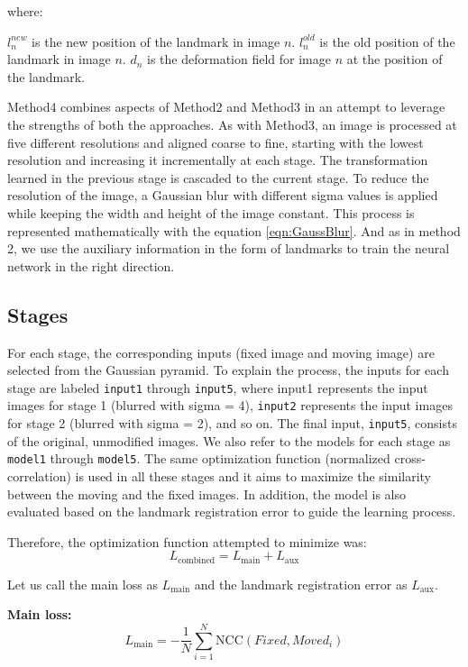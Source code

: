 \documentclass{report}
\begin{document}
	where:
	
	$l_n^{new}$ is the new position of the landmark in image $n$. $l_n^{old}$ is the old position of the landmark in image $n$. $d_n$ is the deformation field for image $n$ at the position of the landmark.
	
	Method4 combines aspects of Method2 and Method3 in an attempt to leverage the strengths of both the approaches. As with Method3, an image is processed at five different resolutions and aligned coarse to fine, starting with the lowest resolution and increasing it incrementally at each stage. The transformation learned in the previous stage is cascaded to the current stage. To reduce the resolution of the image, a Gaussian blur with different sigma values is applied while keeping the width and height of the image constant. This process is represented mathematically with the equation \ref{eqn:GaussBlur}. And as in method 2, we use the auxiliary information in the form of landmarks to train the neural network in the right direction.
	
	\subsection{Stages}
	For each stage, the corresponding inputs (fixed image and moving image) are selected from the Gaussian pyramid. To explain the process, the inputs for each stage are labeled \texttt{input1} through \texttt{input5}, where input1 represents the input images for stage 1 (blurred with sigma = 4), \texttt{input2} represents the input images for stage 2 (blurred with sigma = 2), and so on. The final input, \texttt{input5}, consists of the original, unmodified images. We also refer to the models for each stage as \texttt{model1} through \texttt{model5}. The same optimization function (normalized cross-correlation) is used in all these stages and it aims to maximize the similarity between the moving and the fixed images. In addition, the model is also evaluated based on the landmark registration error to guide the learning process.
	
	Therefore, the optimization function attempted to minimize was:
	\begin{equation}\label{eq:aux_loss_combined}
		L_\text{combined} = L_\text{main} + L_\text{aux}
	\end{equation}
	
	Let us call the main loss as $L_\text{main}$ and the landmark registration error as $L_\text{aux}$.
	
	\textbf{Main loss:}
	\begin{equation}\label{eq:aux_loss_main}
		L_\text{main} = -\frac{1}{N} \sum_{i=1}^N \text{NCC}(Fixed, Moved_i)
	\end{equation}
	
\end{document}
